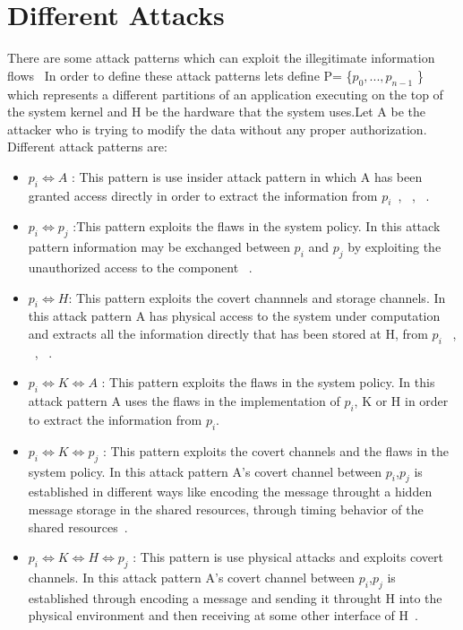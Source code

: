  \section{Different Attacks}
There are some attack patterns which can exploit the illegitimate information
flows~\cite{DBLP:attacks}
In order to define these attack patterns lets define P= \{$p_{0},...,p_{n-1} $ \} which represents a 
different partitions of an  application executing on the top of the
system kernel and H be the hardware that the system uses.Let A be the
attacker who is trying to modify the data without any proper 
authorization.
Different attack patterns are:
\begin{itemize}
 \item $p_{i}\Longleftrightarrow A$ :
 This pattern is use insider attack pattern in which A has been granted access directly in order
 to extract the information from $p_{i}$~\cite{DBLP:attacks}, ~\cite{Baracaldo:attack},
 ~\cite{Yu:attack}.
 
 \item $p_{i}\Longleftrightarrow p_{j}$ :This pattern exploits
 the flaws in the system policy. In this attack pattern information may
 be exchanged between $p_{i}$ and $p_{j}$ by exploiting the unauthorized
 access to the component ~\cite{Lampson:attack2}.
 
 \item $p_{i}\Longleftrightarrow H $:
 This pattern exploits the covert channnels and storage channels.
 In this attack pattern A has physical access to the system under
 computation and extracts all the information directly that
 has been stored at H, from $p_{i}$ ~\cite{vanEck:attack1}, ~\cite{Halevi:attack1}, 
 ~\cite{Backes:attack1}.
 
 \item $p_{i}\Longleftrightarrow K \Longleftrightarrow A$ :
 This pattern exploits the flaws in the system policy.
 In this attack pattern A uses the flaws in the implementation of
 $p_{i}$, K or H in order to extract the information from $p_{i}$.
 
 \item $p_{i}\Longleftrightarrow K \Longleftrightarrow p_{j}$ :
 This pattern exploits the covert channels and the flaws in the 
 system policy. In this attack pattern A's covert channel between
 $p_{i}$,$p_{j}$ is established in different ways like encoding the
 message throught a hidden message storage in the shared resources, 
 through timing behavior of the shared resources~\cite{Lampson:attack2}.
 
 \item $p_{i}\Longleftrightarrow K \Longleftrightarrow H \Longleftrightarrow p_{j}$ :
 This pattern is use physical attacks and exploits covert channels.
In this attack pattern A's covert channel between
 $p_{i}$,$p_{j}$ is established through encoding a message and sending 
 it throught H into the physical environment and then receiving at some other
 interface of H~\cite{Klein:attack3,Robinson:attack3}.

\end{itemize}



